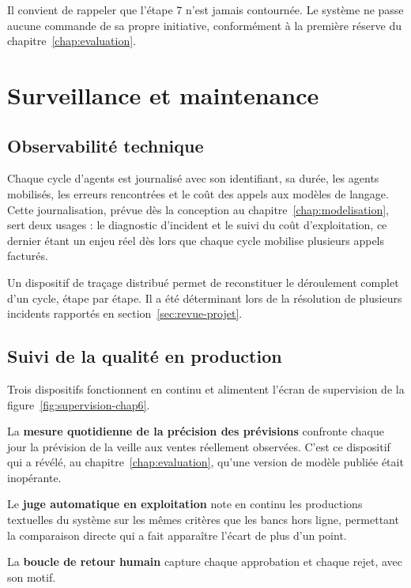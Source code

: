 Il convient de rappeler que l'étape 7 n'est jamais contournée. Le système ne passe aucune commande de sa propre initiative, conformément à la première réserve du chapitre~\ref{chap:evaluation}.

\section{Surveillance et maintenance}
\label{sec:surveillance}

\subsection{Observabilité technique}

Chaque cycle d'agents est journalisé avec son identifiant, sa durée, les agents mobilisés, les erreurs rencontrées et le coût des appels aux modèles de langage. Cette journalisation, prévue dès la conception au chapitre~\ref{chap:modelisation}, sert deux usages : le diagnostic d'incident et le suivi du coût d'exploitation, ce dernier étant un enjeu réel dès lors que chaque cycle mobilise plusieurs appels facturés.

Un dispositif de traçage distribué permet de reconstituer le déroulement complet d'un cycle, étape par étape. Il a été déterminant lors de la résolution de plusieurs incidents rapportés en section~\ref{sec:revue-projet}.

\subsection{Suivi de la qualité en production}

Trois dispositifs fonctionnent en continu et alimentent l'écran de supervision de la figure~\ref{fig:supervision-chap6}.

La \textbf{mesure quotidienne de la précision des prévisions} confronte chaque jour la prévision de la veille aux ventes réellement observées. C'est ce dispositif qui a révélé, au chapitre~\ref{chap:evaluation}, qu'une version de modèle publiée était inopérante.

Le \textbf{juge automatique en exploitation} note en continu les productions textuelles du système sur les mêmes critères que les bancs hors ligne, permettant la comparaison directe qui a fait apparaître l'écart de plus d'un point.

La \textbf{boucle de retour humain} capture chaque approbation et chaque rejet, avec son motif.

